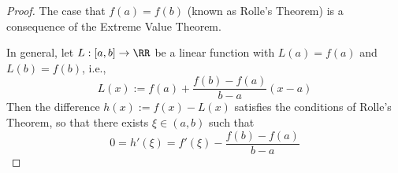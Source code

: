 

\begin{proof}
The case that $f(a)=f(b)$ (known as Rolle's Theorem) 
is a consequence of the Extreme Value Theorem.

In general, let $L:[a,b]\to\RR$ be a linear function 
with $L(a)=f(a)$ and $L(b)=f(b)$, i.e.,
$$
L(x):=f(a) + \frac{f(b)-f(a)}{b-a}(x-a)
$$
Then the difference $h(x):=f(x)-L(x)$ satisfies the conditions 
of Rolle's Theorem, so that there exists $\xi\in(a,b)$ such 
that 
$$
0=h'(\xi)=f'(\xi)-\frac{f(b)-f(a)}{b-a}
$$

\end{proof}

